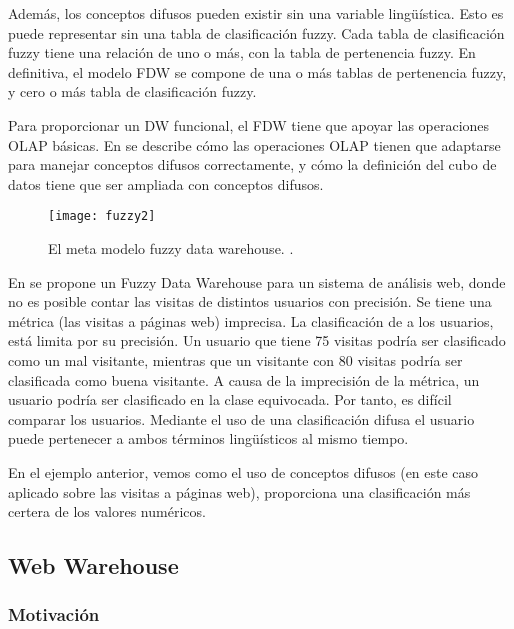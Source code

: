 \documentclass[a4paper,11pt]{article}
\begin{document}
    Además, los conceptos difusos pueden existir sin una variable lingüística. Esto es puede representar sin una tabla de clasificación fuzzy.
    Cada tabla de clasificación fuzzy tiene una relación de uno o más, con la tabla de  pertenencia fuzzy. En definitiva, el modelo FDW se compone de una o más tablas
    de  pertenencia fuzzy, y cero o más tabla de clasificación fuzzy.
    
    Para proporcionar un DW funcional, el FDW tiene que apoyar las operaciones OLAP básicas. En \cite{Fasel14} se describe cómo las operaciones OLAP tienen que
    adaptarse para manejar conceptos difusos correctamente, y cómo la definición del cubo de datos tiene que ser ampliada con conceptos difusos.
    
    \begin{figure}
      \begin{center}
        \texttt{[image: fuzzy2]}
        \caption{El meta modelo fuzzy data warehouse. \cite[p.~63]{Fasel14}.}
        \label{modeloFuzzy}
      \end{center}
    \end{figure}
    
    En \cite{Fasel09} se propone un Fuzzy Data Warehouse para un sistema de análisis web, donde no es posible contar las visitas de distintos usuarios con precisión.
    Se tiene una métrica (las visitas a páginas web) imprecisa. La clasificación de a los usuarios, está limita por su precisión.
    Un usuario que tiene 75 visitas podría ser clasificado como un mal visitante, mientras que un visitante con 80 visitas podría ser clasificada como buena visitante.
    A causa de la imprecisión de la métrica, un usuario podría ser clasificado en la clase equivocada. Por tanto, es difícil comparar los usuarios.
    Mediante el uso de una clasificación difusa el usuario puede pertenecer a ambos términos lingüísticos al mismo tiempo.
    
    En el ejemplo anterior, vemos como el uso de conceptos difusos (en este caso aplicado sobre las visitas a páginas web), proporciona una clasificación más certera
    de los valores numéricos.
    
    
    \subsection{Web Warehouse}
    
    \subsubsection{Motivación}
    
\end{document}

